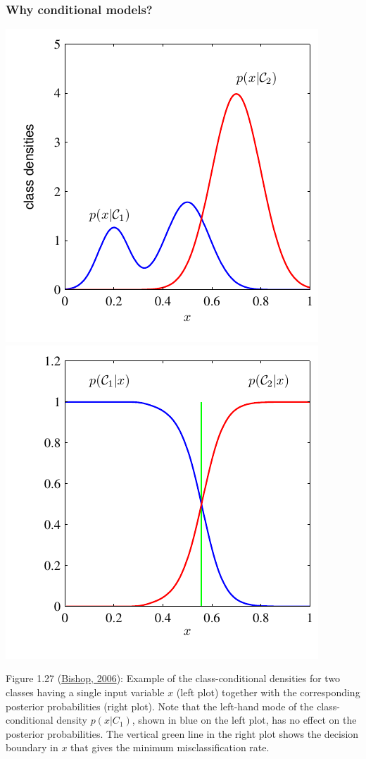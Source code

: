 \documentclass[ignorenonframetext,plain]{beamer}
\begin{document}
\begin{frame}\frametitle{Why conditional models?}
\includegraphics[width=.5\textwidth]{images/Figure1-27a.pdf}
\includegraphics[width=.5\textwidth]{images/Figure1-27b.pdf}

\scriptsize Figure 1.27
(\href{http://research.microsoft.com/en-us/um/people/cmbishop/prml}
{Bishop, 2006}): Example of the class-conditional densities for two
classes having a single input variable $x$ (left plot) together with
the corresponding posterior probabilities (right plot). Note that the
left-hand mode of the class-conditional density $p(x|C_1)$, shown in
blue on the left plot, has no effect on the posterior
probabilities. The vertical green line in the right plot shows the
decision boundary in $x$ that gives the minimum misclassiﬁcation rate.
\end{frame}
\end{document}
